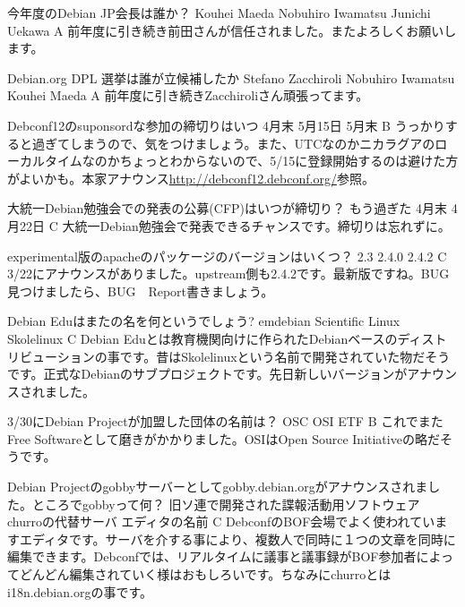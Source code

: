 %

\santaku
{今年度のDebian JP会長は誰か？}
{Kouhei Maeda}
{Nobuhiro Iwamatsu}
{Junichi Uekawa}
{A}
{前年度に引き続き前田さんが信任されました。またよろしくお願いします。}


\santaku
{Debian.org DPL 選挙は誰が立候補したか}
{Stefano Zacchiroli}
{Nobuhiro Iwamatsu}
{Kouhei Maeda}
{A}
{前年度に引き続きZacchiroliさん頑張ってます。}

\santaku
{Debconf12のsuponsordな参加の締切りはいつ}
{4月末}
{5月15日}
{5月末}
{B}
{うっかりすると過ぎてしまうので、気をつけましょう。また、UTCなのかニカラグアのローカルタイムなのかちょっとわからないので、5/15に登録開始するのは避けた方がよいかも。本家アナウンス\url{http://debconf12.debconf.org/}参照。}

\santaku
{大統一Debian勉強会での発表の公募(CFP)はいつが締切り？}
{もう過ぎた}
{4月末}
{4月22日}
{C}
{大統一Debian勉強会で発表できるチャンスです。締切りは忘れずに。}

\santaku
{experimental版のapacheのパッケージのバージョンはいくつ？}
{2.3}
{2.4.0}
{2.4.2}
{C}
{3/22にアナウンスがありました。upstream側も2.4.2です。最新版ですね。BUG見つけましたら、BUG　Report書きましょう。}

\santaku
{Debian Eduはまたの名を何というでしょう?}
{emdebian}
{Scientific Linux}
{Skolelinux}
{C}
{Debian Eduとは教育機関向けに作られたDebianベースのディストリビューションの事です。昔はSkolelinuxという名前で開発されていた物だそうです。正式なDebianのサブプロジェクトです。先日新しいバージョンがアナウンスされました。}

\santaku
{3/30にDebian Projectが加盟した団体の名前は？}
{OSC}
{OSI}
{ETF}
{B}
{これでまたFree Softwareとして磨きがかかりました。OSIはOpen Source Initiativeの略だそうです。}

\santaku
{Debian Projectのgobbyサーバーとしてgobby.debian.orgがアナウンスされました。ところでgobbyって何？}
{旧ソ連で開発された諜報活動用ソフトウェア}
{churroの代替サーバ}
{エディタの名前}
{C}
{DebconfのBOF会場でよく使われていますエディタです。サーバを介する事により、複数人で同時に１つの文章を同時に編集できます。Debconfでは、リアルタイムに議事と議事録がBOF参加者によってどんどん編集されていく様はおもしろいです。ちなみにchurroとはi18n.debian.orgの事です。}


